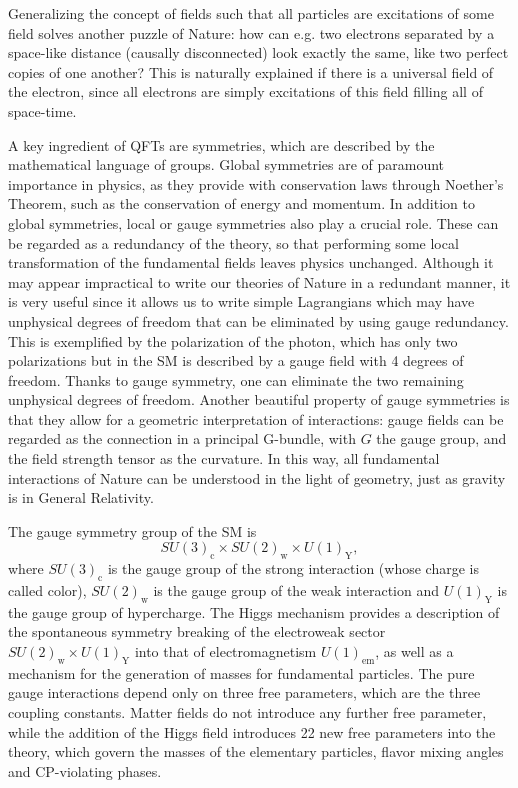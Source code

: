 Generalizing the concept of fields such that all particles are excitations of some field solves another puzzle of Nature: how can e.g. two electrons separated by a space-like distance (causally disconnected) look exactly the same, like two perfect copies of one another? This is naturally explained if there is a universal field of the electron, since all electrons are simply excitations of this field filling all of space-time. 

A key ingredient of QFTs are symmetries, which are described by the mathematical language of groups. Global symmetries are of paramount importance in physics, as they provide with conservation laws through Noether's Theorem, such as the conservation of energy and momentum. In addition to global symmetries, local or gauge symmetries also play a crucial role. These can be regarded as a redundancy of the theory, so that performing some local transformation of the fundamental fields leaves physics unchanged. Although it may appear impractical to write our theories of Nature in a redundant manner, it is very useful since it allows us to write simple Lagrangians which may have unphysical degrees of freedom that can be eliminated by using gauge redundancy. This is exemplified by the polarization of the photon, which has only two polarizations but in the SM is described by a gauge field with 4 degrees of freedom. Thanks to gauge symmetry, one can eliminate the two remaining unphysical degrees of freedom. Another beautiful property of gauge symmetries is that they allow for a geometric interpretation of interactions: gauge fields can be regarded as the connection in a principal G-bundle, with $G$ the gauge group, and the field strength tensor as the curvature. In this way, all fundamental interactions of Nature can be understood in the light of geometry, just as gravity is in General Relativity.

The gauge symmetry group of the SM is
\begin{equation*}
SU(3)_{\textrm{c}}\times SU(2)_{\textrm{w}}\times U(1)_{\textrm{Y}},
\end{equation*}
where $SU(3)_{\textrm{c}}$ is the gauge group of the strong interaction (whose charge is called color), $SU(2)_{\textrm{w}}$ is the gauge group of the weak interaction and $U(1)_{\textrm{Y}}$ is the gauge group of hypercharge. The Higgs mechanism provides a description of the spontaneous symmetry breaking of the electroweak sector $SU(2)_{\textrm{w}}\times U(1)_{\textrm{Y}}$ into that of electromagnetism $U(1)_{\textrm{em}}$, as well as a mechanism for the generation of masses for fundamental particles. The pure gauge interactions depend only on three free parameters, which are the three coupling constants. Matter fields do not introduce any further free parameter, while the addition of the Higgs field introduces 22 new free parameters into the theory, which govern the masses of the elementary particles, flavor mixing angles and CP-violating phases.

